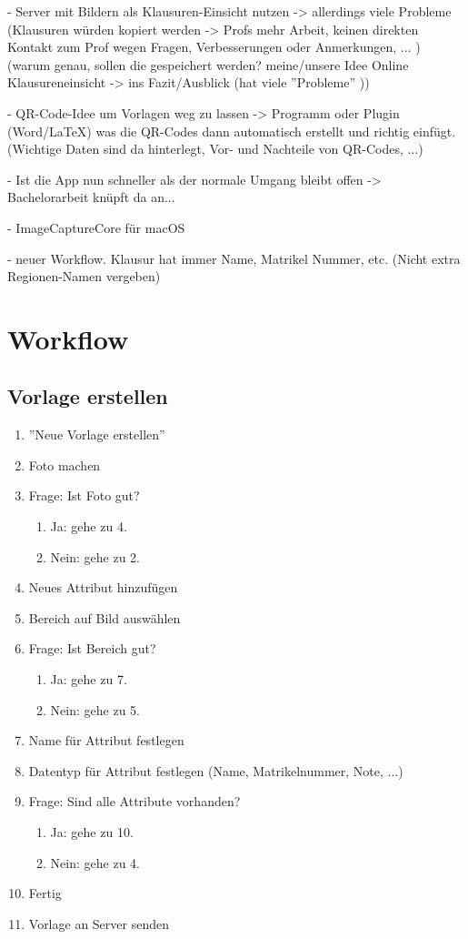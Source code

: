 \documentclass[nomenclature, oneside, 150]{HSMW-Thesis}
\begin{document}
	- Server mit Bildern als Klausuren-Einsicht nutzen -> allerdings viele Probleme (Klausuren würden kopiert werden -> Profs mehr Arbeit, keinen direkten Kontakt zum Prof wegen Fragen, Verbesserungen oder Anmerkungen, ... )
	  (warum genau, sollen die gespeichert werden? meine/unsere Idee Online Klausureneinsicht -> ins Fazit/Ausblick (hat viele ''Probleme'' ))
	
	- QR-Code-Idee um Vorlagen weg zu lassen -> Programm oder Plugin (Word/LaTeX) was die QR-Codes dann automatisch erstellt und richtig einfügt. (Wichtige Daten sind da hinterlegt, Vor- und Nachteile von QR-Codes, ...)
	
	- Ist die App nun schneller als der normale Umgang bleibt offen -> Bachelorarbeit knüpft da an...
	
	- ImageCaptureCore für macOS
	
	- neuer Workflow. Klausur hat immer Name, Matrikel Nummer, etc. (Nicht extra Regionen-Namen vergeben)
	

\Anhang

\chapter{Workflow} \label{ch:workflow}
	\section*{Vorlage erstellen}
	\begin{enumerate}
		\item ''Neue Vorlage erstellen''
		\item Foto machen
		\item Frage: Ist Foto gut? 
		\begin{enumerate}
			\item Ja: gehe zu 4.
			\item Nein: gehe zu 2.
		\end{enumerate}
		\item Neues Attribut hinzufügen
		\item Bereich auf Bild auswählen
		\item Frage: Ist Bereich gut?
		\begin{enumerate}
			\item Ja: gehe zu 7.
			\item Nein: gehe zu 5.
		\end{enumerate}
		\item Name für Attribut festlegen
		\item Datentyp für Attribut festlegen (Name, Matrikelnummer, Note, ...)
		\item Frage: Sind alle Attribute vorhanden?
		\begin{enumerate}
			\item Ja: gehe zu 10.
			\item Nein: gehe zu 4.
		\end{enumerate}
		\item Fertig
		\item Vorlage an Server senden
	\end{enumerate}
	
\end{document}
